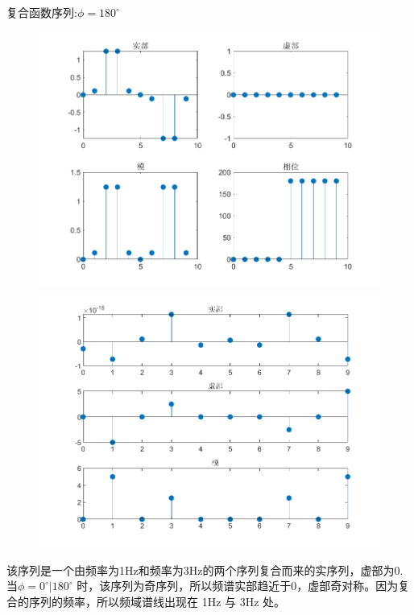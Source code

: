 \documentclass{beamer}
\begin{document}
\begin{frame}[t]{复合函数序列:$\phi = 180^\circ$}
    \begin{figure}
        \centering
        \begin{minipage}[t]{0.48\textwidth}
        \centering
        \includegraphics[width=\textwidth]{figure/复合函数序列_phi=180.png}
        \end{minipage}
        \begin{minipage}[t]{0.48\textwidth}
        \centering
        \includegraphics[width=\textwidth]{figure/频谱_复合函数序列_phi=180.png}
        \end{minipage}
    \end{figure}

    \begin{block}{}
        该序列是一个由频率为1Hz和频率为3Hz的两个序列复合而来的实序列，虚部为0. 当$\phi =0^\circ | 180^\circ$
时，该序列为奇序列，所以频谱实部趋近于0，虚部奇对称。因为复合的序列的频率，所以频域谱线出现在 1Hz 与 3Hz 处。
    \end{block}

\end{frame}
\end{document}
